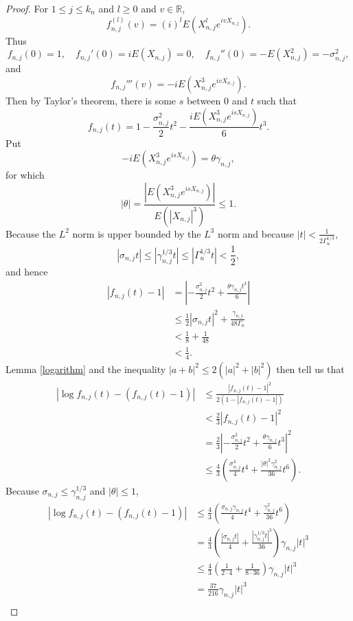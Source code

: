 \documentclass{article}
\theoremstyle{definition}
\begin{document}
\begin{proof}
For $1 \leq j \leq k_n$ and $l \geq 0$ and $v \in \mathbb{R}$,
\[
f_{n,j}^{(l)}(v) = (i)^l E(X_{n,j}^l e^{ivX_{n,j}}).
\]
Thus
\[
f_{n,j}(0) = 1, \quad f_{n,j}'(0) = iE(X_{n,j})=0, \quad  f_{n,j}''(0) = -E(X_{n,j}^2) = - \sigma_{n,j}^2,
\]
and
\[
f_{n,j}'''(v)=-iE(X_{n,j}^3 e^{ivX_{n,j}}).
\]
Then by Taylor's theorem, there is some $s$ between $0$ and $t$ such that
\[
f_{n,j}(t) = 1 -\frac{\sigma_{n,j}^2}{2} t^2 -\frac{iE(X_{n,j}^3 e^{isX_{n,j}})}{6} t^3.
\]
Put
\[
-iE(X_{n,j}^3 e^{isX_{n,j}})=\theta \gamma_{n,j},
\]
for which
\[
|\theta| = \frac{|E(X_{n,j}^3 e^{isX_{n,j}})|}{E(|X_{n,j}|^3)}
\leq 1.
\]
Because
the $L^2$ norm is upper bounded by the $L^3$ norm and because
 $|t| < \frac{1}{2\Gamma_n^{1/3}}$,
\[
|\sigma_{n,j} t| \leq |\gamma_{n,j}^{1/3} t| \leq |\Gamma_n^{1/3} t| < \frac{1}{2},
\]
and hence
\begin{align*}
|f_{n,j}(t)-1|&=\left|-\frac{\sigma_{n,j}^2}{2}t^2 + \frac{\theta \gamma_{n,j} t^3}{6} \right|\\
&\leq \frac{1}{2} |\sigma_{n,j} t|^2
+ \frac{\gamma_{n,j}}{48 \Gamma_n}\\
&< \frac{1}{8}+ \frac{1}{48}\\
&<\frac{1}{4}.
\end{align*}
Lemma \ref{logarithm} and the inequality 
$|a+b|^2 \leq 2(|a|^2+|b|^2)$
then tell us that  
\begin{align*}
\left|\log f_{n,j}(t) - (f_{n,j}(t)-1)\right| &\leq \frac{|f_{n,j}(t)-1|^2}{2(1-|f_{n,j}(t)-1|)}\\
&<\frac{2}{3} |f_{n,j}(t)-1|^2\\
&= \frac{2}{3} \left| -\frac{\sigma_{n,j}^2}{2}t^2+\frac{\theta \gamma_{n,j}}{6} t^3 \right|^2\\
&\leq \frac{4}{3}\left( \frac{\sigma_{n,j}^4}{4}t^4 + \frac{|\theta|^2 \gamma_{n,j}^2}{36}t^6\right).
\end{align*}
Because $\sigma_{n,j} \leq \gamma_{n,j}^{1/3}$ and $|\theta| \leq 1$,
\begin{align*}
\left|\log f_{n,j}(t) - (f_{n,j}(t)-1)\right| &\leq \frac{4}{3} \left( \frac{\sigma_{n,j} \gamma_{n,j}}{4} t^4 
+\frac{\gamma_{n,j}^2}{36} t^6\right)\\
&=\frac{4}{3}\left( \frac{|\sigma_{n,j} t|}{4} + \frac{|\gamma_{n,j}^{1/3} t|^3}{36} \right) \gamma_{n,j} |t|^3\\
&\leq \frac{4}{3}\left(\frac{1}{2\cdot 4}+\frac{1}{8\cdot 36}\right) \gamma_{n,j} |t|^3\\
&=\frac{37}{216} \gamma_{n,j} |t|^3\\

\end{align*}
\end{proof}
\end{document}
